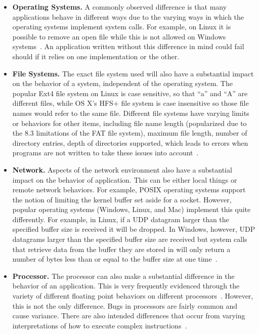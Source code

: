 \begin{itemize}

\item {\bf Operating Systems.}  A commonly observed difference is that many
applications behave in different ways due to the varying ways in which the
operating systems implement system calls.  For example, on Linux it is
possible to remove an open file while this is not allowed on Windows
systems~\cite{UnlinkStandard}.  An application written without this
difference in mind could fail should if it relies on one implementation or
the other.

\item {\bf File Systems.}  The exact file system used will also have a
substantial impact on the behavior of a system, independent of the
operating system.  The popular Ext4 file system on Linux is case sensitive,
so that ``a'' and ``A'' are different files, while OS X's HFS+ file system
is case insensitive so those file names would refer to the same file.
Different file systems have varying limits or behaviors for other items,
including file name length (popularized due to the 8.3 limitations of the
FAT file system), maximum file length, number of directory entries, depth
of directories supported, which leads to errors when programs are not
written to take these issues into account~\cite{EXT4Layout, AppleHFS}.

\item {\bf Network.}  Aspects of the network environment also have a
substantial impact on the behavior of application.  This can be either
local things or remote network behaviors.  For example, POSIX operating
systems support the notion of limiting the kernel buffer set aside for a
socket.  However, popular operating systems (Windows, Linux, and Mac)
implement this quite differently.  For example, in Linux, if a UDP datagram
larger than the specified buffer size is received it will be dropped.  In
Windows, however, UDP datagrams larger than the specified buffer size are
received but system calls that retrieve data from the buffer they are
stored in will only return a number of bytes less than or equal to the
buffer size at one time~\cite{Zhuang_NSDI_2014}.

\item {\bf Processor.}  The processor can also make a substantial
difference in the behavior of an application.  This is very frequently
evidenced through the variety of different floating point behaviors on
different processors~\cite{ArbitraryPrecision}.  However, this is not the
only difference.  Bugs in processors are fairly common and cause variance.
There are also intended differences that occur from varying interpretations
of how to execute complex instructions~\cite{Microarch}.

\end{itemize}

